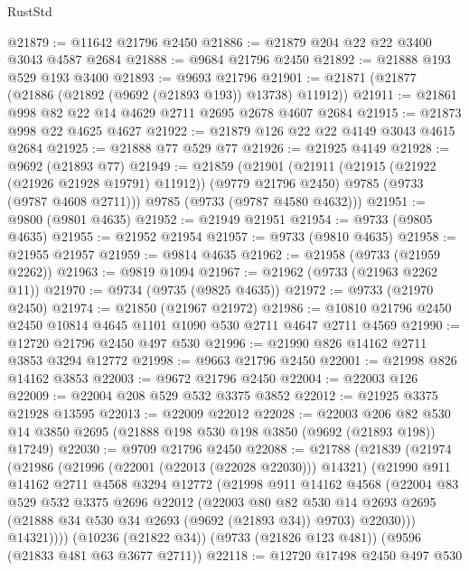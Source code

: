 \begin{lexlean}{RustStd}
\begin{coremodule}
{\begin{coremodule}
{{{{{{{{{{{{{{{{{{{{{{{{{{{{{{{{{{{{{{{{{{{{{{{{{{{{{{{@21879 := @11642 @21796 @2450
@21886 := @21879 @204 @22 @22 @3400 @3043 @4587 @2684
@21888 := @9684 @21796 @2450
@21892 := @21888 @193 @529 @193 @3400
@21893 := @9693 @21796
@21901 := @21871 (@21877 (@21886 (@21892 (@9692 (@21893 @193)) @13738) @11912))
@21911 := @21861 @998 @82 @22 @14 @4629 @2711 @2695 @2678 @4607 @2684
@21915 := @21873 @998 @22 @4625 @4627
@21922 := @21879 @126 @22 @22 @4149 @3043 @4615 @2684
@21925 := @21888 @77 @529 @77
@21926 := @21925 @4149
@21928 := @9692 (@21893 @77)
@21949 := @21859
    (@21901
      (@21911
        (@21915 (@21922 (@21926 @21928 @19791) @11912))
        (@9779 @21796 @2450)
        @9785
        (@9733 (@9787 @4608 @2711)))
      @9785
      (@9733 (@9787 @4580 @4632)))
@21951 := @9800 (@9801 @4635)
@21952 := @21949 @21951
@21954 := @9733 (@9805 @4635)
@21955 := @21952 @21954
@21957 := @9733 (@9810 @4635)
@21958 := @21955 @21957
@21959 := @9814 @4635
@21962 := @21958 (@9733 (@21959 @2262))
@21963 := @9819 @1094
@21967 := @21962 (@9733 (@21963 @2262 @11))
@21970 := @9734 (@9735 (@9825 @4635))
@21972 := @9733 (@21970 @2450)
@21974 := @21850 (@21967 @21972)
@21986 := @10810 @21796 @2450 @2450 @10814 @4645 @1101 @1090 @530 @2711 @4647 @2711 @4569
@21990 := @12720 @21796 @2450 @497 @530
@21996 := @21990 @826 @14162 @2711 @3853 @3294 @12772
@21998 := @9663 @21796 @2450
@22001 := @21998 @826 @14162 @3853
@22003 := @9672 @21796 @2450
@22004 := @22003 @126
@22009 := @22004 @208 @529 @532 @3375 @3852
@22012 := @21925 @3375 @21928 @13595
@22013 := @22009 @22012
@22028 := @22003
    @206
    @82
    @530
    @14
    @3850
    @2695
    (@21888 @198 @530 @198 @3850 (@9692 (@21893 @198)) @17249)
@22030 := @9709 @21796 @2450
@22088 := @21788
    (@21839
      (@21974
        (@21986
          (@21996 (@22001 (@22013 (@22028 @22030))) @14321)
          (@21990
            @911
            @14162
            @2711
            @4568
            @3294
            @12772
            (@21998
              @911
              @14162
              @4568
              (@22004
                @83
                @529
                @532
                @3375
                @2696
                @22012
                (@22003
                  @80
                  @82
                  @530
                  @14
                  @2693
                  @2695
                  (@21888 @34 @530 @34 @2693 (@9692 (@21893 @34)) @9703)
                  @22030)))
            @14321))))
    (@10236 (@21822 @34))
    (@9733 (@21826 @123 @481))
    (@9596 (@21833 @481 @63 @3677 @2711))
@22118 := @12720
    @17498
    @2450
    @497
    @530
}}}}}}}}}}}}}}}}}}}}}}}}}}}}}}}}}}}}}}}}}}}}}}}}}}}}}}}
\end{coremodule}}
\end{coremodule}
\end{lexlean}
